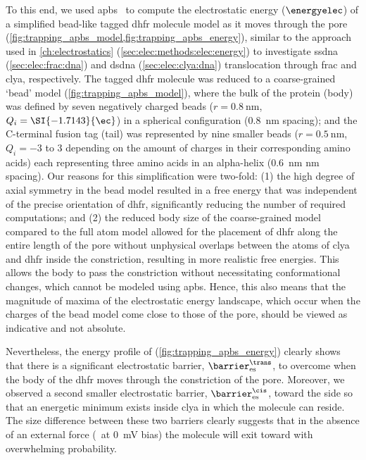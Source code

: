 To this end, we used \gls{apbs}~\cite{Baker-2001,Dolinsky-2004,Dolinsky-2007,Li-2005} to compute the
electrostatic energy ($\energyelec$) of a simplified bead-like tagged \gls{dhfr} molecule model as it moves
through the pore (\cref{fig:trapping_apbs_model,fig:trapping_apbs_energy}), similar to the approach used in
\cref{ch:electrostatics} (\cref{sec:elec:methods:elec:energy}) to investigate \gls{ssdna}
(\cref{sec:elec:frac:dna}) and \gls{dsdna} (\cref{sec:elec:clya:dna}) translocation through \gls{frac} and
\gls{clya}, respectively. The tagged \gls{dhfr} molecule was reduced to a coarse-grained `bead' model
(\cref{fig:trapping_apbs_model}), where the bulk of the protein (body) was defined by seven negatively charged
beads ($r = \SI{0.8}{\nm}$, $Q_i = \SI{-1.7143}{\ec}$) in a spherical configuration (\SI{0.8}{\nm} spacing);
and the C-terminal fusion tag (tail) was represented by nine smaller beads ($r = \SI{0.5}{\nm}$, $Q_i =
\num{-3}$ to \SI{+3}{\ec} depending on the amount of charges in their corresponding amino acids) each
representing three amino acids in an alpha-helix (\SI{0.6}{\nm} nm spacing). Our reasons for this
simplification were two-fold: (1) the high degree of axial symmetry in the bead model resulted in a free
energy that was independent of the precise orientation of \gls{dhfr}, significantly reducing the number of
required computations; and (2) the reduced body size of the coarse-grained model compared to the full atom
model allowed for the placement of \gls{dhfr} along the entire length of the pore without unphysical overlaps
between the atoms of \gls{clya} and \gls{dhfr} inside the \transi{} constriction, resulting in more realistic
free energies. This allows the body to pass the constriction without necessitating conformational changes,
which cannot be modeled using \gls{apbs}. Hence, this also means that the magnitude of maxima of the
electrostatic energy landscape, which occur when the charges of the bead model come close to those of the
pore, should be viewed as indicative and not absolute.

Nevertheless, the energy profile of \DHFRt{} (\cref{fig:trapping_apbs_energy}) clearly shows that there is a
significant electrostatic barrier, $\barrier^{\trans}_{\rm{es}}$, to overcome when the body of the \gls{dhfr}
moves through the constriction of the pore. Moreover, we observed a second smaller electrostatic barrier,
$\barrier^{\cis}_{\rm{es}}$, toward the \cisi{} side so that an energetic minimum exists inside \gls{clya} in
which the molecule can reside. The size difference between these two barriers clearly suggests that in the
absence of an external force (\ie~at \SI{0}{\mV} bias) the molecule will exit toward \cisi{} with overwhelming
probability.

